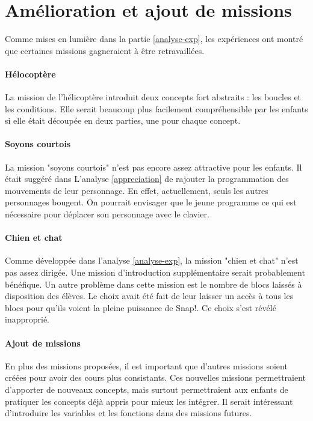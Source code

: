 \section{Amélioration et ajout de missions}
Comme mises en lumière dans la partie \ref{analyse-exp}, les expériences ont montré que certaines missions gagneraient à être retravaillées.

\paragraph{Hélocoptère}
La mission de l'hélicoptère introduit deux concepts fort abstraits : les boucles et les conditions. Elle serait beaucoup plus facilement compréhensible par les enfants si elle était découpée en deux parties, une pour chaque concept.

\paragraph{Soyons courtois}
La mission "soyons courtois" n'est pas encore assez attractive pour les enfants. Il était suggéré dans L'analyse \ref{appreciation} de rajouter la programmation des mouvements de leur personnage. En effet, actuellement, seuls les autres personnages bougent. On pourrait envisager que le jeune programme ce qui est nécessaire pour déplacer son personnage avec le clavier.

\paragraph{Chien et chat}
Comme développée dans l'analyse \ref{analyse-exp}, la mission "chien et chat" n'est pas assez dirigée. Une mission d'introduction supplémentaire serait probablement bénéfique. Un autre problème dans cette mission est le nombre de blocs laissés à disposition des élèves. Le choix avait été fait de leur laisser un accès à tous les blocs pour qu'ils voient la pleine puissance de Snap!. Ce choix s'est révélé inapproprié. 

\paragraph{Ajout de missions}
En plus des missions proposées, il est important que d'autres missions soient créées pour avoir des cours plus consistants. Ces nouvelles missions permettraient d'apporter de nouveaux concepts, mais surtout permettraient aux enfants de pratiquer les concepts déjà appris pour mieux les intégrer. Il serait intéressant d'introduire les variables et les fonctions dans des missions futures.


